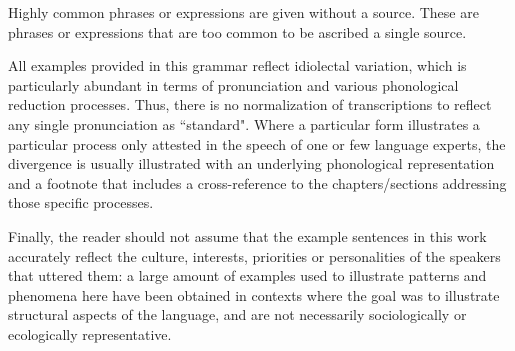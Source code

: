 \ea\label{ex: example of dialogue}

    \z
\z

Highly common phrases or expressions are given without a source. These are phrases or expressions that are too common to be ascribed a single source.

All examples provided in this grammar reflect idiolectal variation, which is particularly abundant in terms of pronunciation and various phonological reduction processes. Thus, there is no normalization of transcriptions to reflect any single pronunciation as ``standard". Where a particular form illustrates a particular process only attested in the speech of one or few language experts, the divergence is usually illustrated with an underlying phonological representation and a footnote that includes a cross-reference to the chapters/sections addressing those specific processes.

Finally, the reader should not assume that the example sentences in this work accurately reflect the culture, interests, priorities or personalities of the speakers that uttered them: a large amount of examples used to illustrate patterns and phenomena here have been obtained in contexts where the goal was to illustrate structural aspects of the language, and are not necessarily sociologically or ecologically representative.

